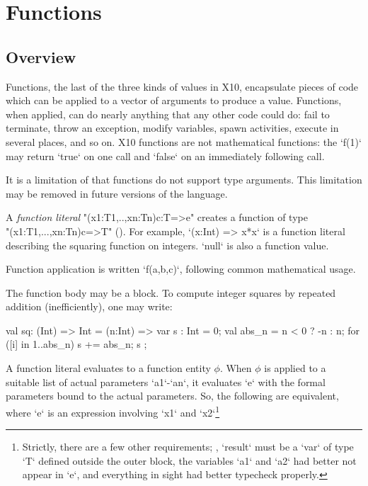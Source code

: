 

\chapter{Functions}
\label{Functions}
\label{functions}
\label{Closures}

\section{Overview}
Functions, the last of the three kinds of values in X10, encapsulate pieces of
code which can be applied to a vector of arguments to produce a value.
Functions, when applied, can do nearly anything that any other code could do:
fail to terminate, throw an exception, modify variables, spawn activities,
execute in several places, and so on. X10 functions are not mathematical
functions: the \xcd`f(1)` may return \xcd`true` on one call and \xcd`false` on
an immediately following call.

It is a limitation of \XtenCurrVer{} that functions do not support
type arguments. This limitation may be removed in future versions of
the language.

A \emph{function literal} \xcd"(x1:T1,..,xn:Tn){c}:T=>e" creates a function of
type\\ \xcd"(x1:T1,...,xn:Tn){c}=>T" ().  For example, 
\xcd`(x:Int) => x*x` is a function literal describing the squaring function on
integers.   
\xcd`null` is also a function value.

Function application is written \xcd`f(a,b,c)`, following common mathematical
usage. 


The function body may be a block.  To compute integer squares by repeated
addition (inefficiently), one may write: 
\begin{xten}
val sq: (Int) => Int 
      = (n:Int) => {
           var s : Int = 0;
           val abs_n = n < 0 ? -n : n;
           for ([i] in 1..abs_n) s += abs_n;
           s
        };
\end{xten}




A function literal evaluates to a function entity {$\phi$}. When {$\phi$} is
applied to a suitable list of actual parameters \xcd`a1`-\xcd`an`, it
evaluates \xcd`e` with the formal parameters bound to the actual parameters.
So, the following are equivalent, where \xcd`e` is an expression involving
\xcd`x1` and \xcd`x2`\footnote{Strictly, there are a few other requirements;
  \eg, \xcd`result` must be a \xcd`var` of type \xcd`T` defined outside the
  outer block, the variables \xcd`a1` and \xcd`a2` had better not appear in
  \xcd`e`, and everything in sight had better typecheck properly.}

